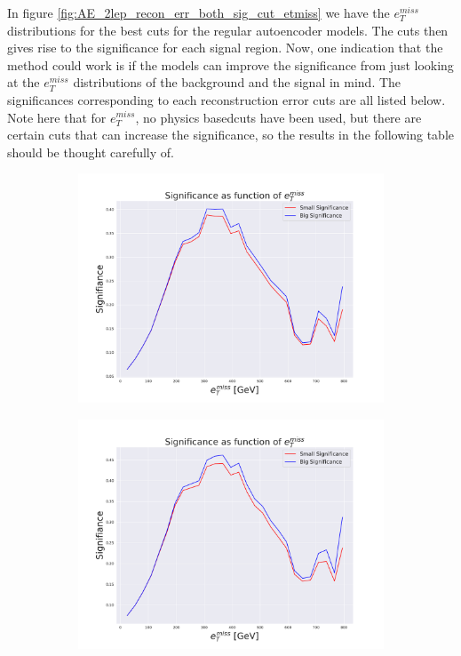 In figure \ref{fig:AE_2lep_recon_err_both_sig_cut_etmiss} we have the $e_T^{miss}$ distributions for the best cuts for the regular autoencoder models.
The cuts then gives rise to the significance for each signal region. Now, one indication that the method could work is if the models can improve the 
significance from just looking at the $e_T^{miss}$ distributions of the background and the signal in mind. The significances corresponding to each 
reconstruction error cuts are all listed below. Note here that for $e_T^{miss}$, no physics basedcuts have been used, but there are certain cuts 
that can increase the significance, so the results in the following table should be thought carefully of.


\begin{figure}[H]
    \centering
    \begin{subfigure}{.45\textwidth}
        \includegraphics[width=\textwidth]{Figures/AE_testing/big/2lep/significance_etmiss_450p0p0300.pdf}
        \caption{ }
        \label{fig:AE_2lep_big_450_signi}
    \end{subfigure}
    \hfill
    \begin{subfigure}{.45\textwidth}
        \includegraphics[width=\textwidth]{Figures/AE_testing/small/2lep/significance_etmiss_450p0p0300.pdf}

\end{subfigure}
\end{figure}
